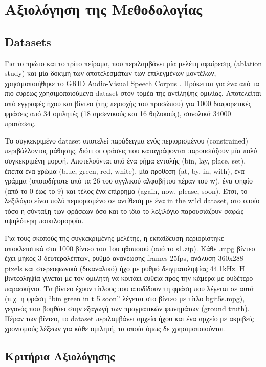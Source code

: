 \section{Αξιολόγηση της Μεθοδολογίας}
\label{Evaluation}

\subsection{Datasets}
\label{Datasets}
Για το πρώτο και το τρίτο πείραμα, που περιλαμβάνει μία μελέτη αφαίρεσης (ablation study) και μία δοκιμή των αποτελεσμάτων των επιλεγμένων μοντέλων, χρησιμοποιήθηκε το GRID Audio-Visual Speech Corpus \cite{cooke_2006_3625687}. Πρόκειται για ένα από τα πιο ευρέως χρησιμοποιούμενα dataset στον τομέα της αντίληψης ομιλίας. Αποτελείται από εγγραφές ήχου και βίντεο (της περιοχής του προσώπου) για 1000 διαφορετικές φράσεις από 34 ομιλητές (18 αρσενικούς και 16 θηλυκούς), συνολικά 34000 προτάσεις. 

Το συγκεκριμένο dataset αποτελεί παράδειγμα ενός περιορισμένου (constrained) περιβάλλοντος μάθησης, διότι οι φράσεις που καταγράφονται παρουσιάζουν μία πολύ συγκεκριμένη μορφή. Απο\-τε\-λού\-νται από ένα ρήμα εντολής (bin, lay, place, set), έπειτα ένα χρώμα (blue, green, red, white), μία πρόθεση (at, by, in, with), ένα γράμμα (οποιοδήποτε από τα 26 του αγγλικού αλφαβήτου πέραν του w), ένα ψηφίο (από το 0 έως το 9) και τέλος ένα επίρρημα (again, now, please, soon). Έτσι, το λεξιλόγιο είναι πολύ περιορισμένο σε αντίθεση με ένα in the wild dataset, στο οποίο τόσο η σύνταξη των φράσεων όσο και το ίδιο το λεξιλόγιο παρουσιάζουν σαφώς υψηλότερη ποικιλομορφία.

Για τους σκοπούς της συγκεκριμένης μελέτης, η εκπαίδευση περιορίστηκε αποκλειστικά στα 1000 βίντεο του 1ου ηθοποιού (από το s1.zip). Κάθε .mpg βίντεο έχει μήκος 3 δευτερολέπτων, ρυθμό α\-να\-νέ\-ω\-σης frames 25fps, ανάλυση 360x288 pixels και στερεοφωνικό (δικαναλικό) ήχο με ρυθμό δειγματοληψίας 44.1kHz. Η βιντεοληψία γίνεται με τον ομιλητή να κοιτάει ευθεία προς την κάμερα με ουδέτερο παρασκήνιο. Τα βίντεο έχουν τίτλους που αποδίδουν τη φράση που λέγεται σε αυτά (π.χ. η φράση ``bin green in t 5 soon'' λέγεται στο βίντεο με τίτλο bgit5s.mpg), γεγονός που βοηθάει στην εξαγωγή των πραγματικών φωνημάτων (ground truth). Πέραν των βίντεο, το dataset περιλαμβάνει αρχεία ήχου και ένα αρχείο με ακριβείς χρονισμούς λέξεων για κάθε ομιλητή, τα οποία όμως δε χρησιμοποιούνται.

\subsection{Κριτήρια Αξιολόγησης}
\label{Criteria}

